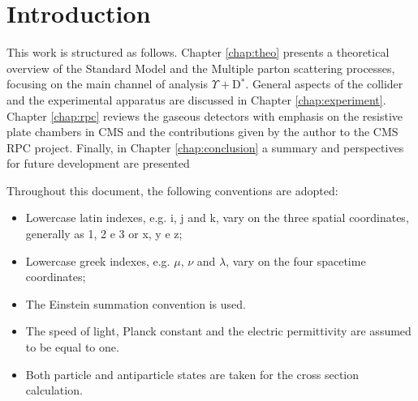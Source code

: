 \chapter*{Introduction}



This work is structured as follows. Chapter \ref{chap:theo} presents a theoretical overview of the Standard Model and the Multiple parton scattering processes, focusing on the main channel of analysis $\Upsilon + $D$^*$. General aspects of the collider and the experimental apparatus are discussed in Chapter \ref{chap:experiment}. Chapter \ref{chap:rpc} reviews the gaseous detectors with emphasis on the resistive plate chambers in CMS and the contributions given by the author to the CMS RPC project. Finally, in Chapter \ref{chap:conclusion} a summary and perspectives for future development are presented

Throughout this document, the following conventions are adopted:
\begin{itemize}
    \item Lowercase latin indexes, e.g. i, j and k, vary on the three spatial coordinates, generally as 1, 2 e 3 or x, y e z;
    \item Lowercase greek indexes, e.g. $\mu$, $\nu$ and $\lambda$, vary on the four spacetime coordinates;
    \item The Einstein summation convention is used.
    \item The speed of light, Planck constant and the electric permittivity are assumed to be equal to one.
    \item Both particle and antiparticle states are taken for the cross section calculation.
\end{itemize}
